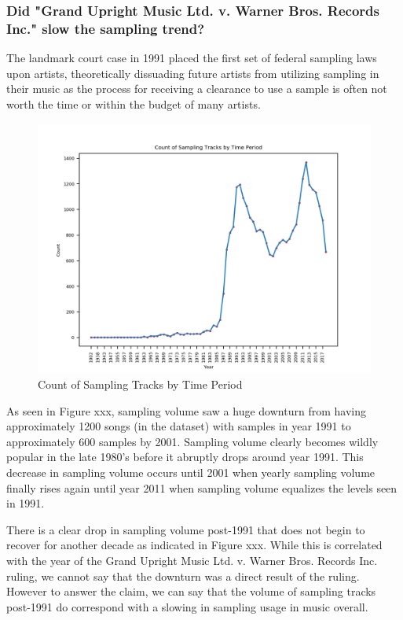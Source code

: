 \documentclass[pageno]{jpaper}
\begin{document}
\subsubsection{Did "Grand Upright Music Ltd. v. Warner Bros. Records Inc." slow the sampling trend?}
The landmark court case in 1991 placed the first set of federal sampling laws upon artists, theoretically dissuading future artists from utilizing sampling in their music as the process for receiving a clearance to use a sample is often not worth the time or within the budget of many artists.
\begin{figure}[H]
\includegraphics{TimePeriods/samplingTimePeriod}
\caption{Count of Sampling Tracks by Time Period}
\centering
\end{figure}
As seen in Figure xxx, sampling volume saw a huge downturn from having approximately 1200 songs (in the dataset) with samples in year 1991 to approximately 600 samples by 2001. Sampling volume clearly becomes wildly popular in the late 1980's before it abruptly drops around year 1991. This decrease in sampling volume occurs until 2001 when yearly sampling volume finally rises again until year 2011 when sampling volume equalizes the levels seen in 1991.

There is a clear drop in sampling volume post-1991 that does not begin to recover for another decade as indicated in Figure xxx. While this is correlated with the year of the Grand Upright Music Ltd. v. Warner Bros. Records Inc. ruling, we cannot say that the downturn was a direct result of the ruling. However to answer the claim, we can say that the volume of sampling tracks post-1991 do correspond with a slowing in sampling usage in music overall.
\end{document}
